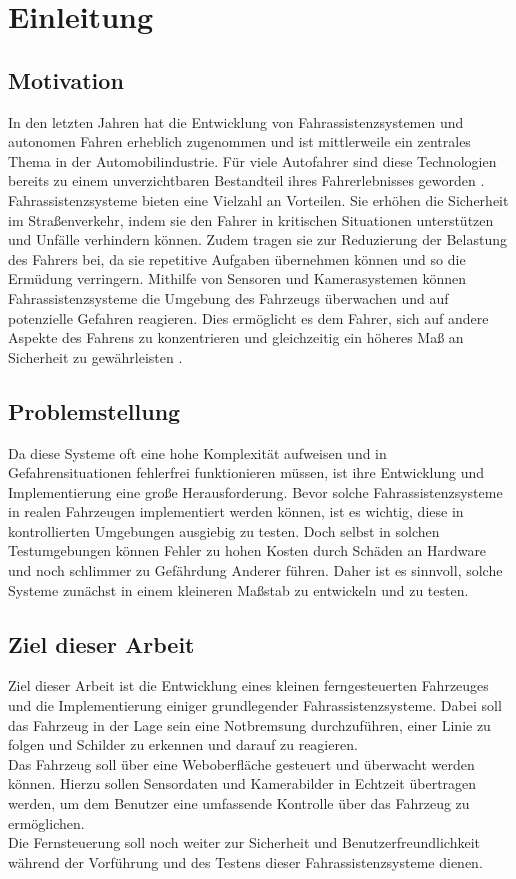 \chapter{Einleitung}
\label{chap:einleitung}
\section{Motivation}
In den letzten Jahren hat die Entwicklung von Fahrassistenzsystemen und autonomen Fahren erheblich zugenommen und ist mittlerweile ein zentrales Thema in der Automobilindustrie. Für viele Autofahrer sind diese Technologien bereits zu einem unverzichtbaren Bestandteil ihres Fahrerlebnisses geworden \cite{InfografikSelbstbestimmteAutofahrer}. 
Fahrassistenzsysteme bieten eine Vielzahl an Vorteilen. Sie erhöhen die Sicherheit im Straßenverkehr, indem sie den Fahrer in kritischen Situationen unterstützen und Unfälle verhindern können. Zudem tragen sie zur Reduzierung der Belastung des Fahrers bei, da sie repetitive Aufgaben übernehmen können und so die Ermüdung verringern.
Mithilfe von Sensoren und Kamerasystemen können Fahrassistenzsysteme die Umgebung des Fahrzeugs überwachen und auf potenzielle Gefahren reagieren. Dies ermöglicht es dem Fahrer, sich auf andere Aspekte des Fahrens zu konzentrieren und gleichzeitig ein höheres Maß an Sicherheit zu gewährleisten \cite[S. 65 ff.]{fahrassistenz}. 

\section{Problemstellung}
Da diese Systeme oft eine hohe Komplexität aufweisen und in Gefahrensituationen fehlerfrei funktionieren müssen, ist ihre Entwicklung und Implementierung eine große Herausforderung.
Bevor solche Fahrassistenzsysteme in realen Fahrzeugen implementiert werden können, ist es wichtig, diese in kontrollierten Umgebungen ausgiebig zu testen. Doch selbst in solchen Testumgebungen können Fehler zu hohen Kosten durch Schäden an Hardware und noch schlimmer zu Gefährdung Anderer führen.
Daher ist es sinnvoll, solche Systeme zunächst in einem kleineren Maßstab zu entwickeln und zu testen.

\section{Ziel dieser Arbeit}
Ziel dieser Arbeit ist die Entwicklung eines kleinen ferngesteuerten Fahrzeuges und die Implementierung einiger grundlegender Fahrassistenzsysteme. Dabei soll das Fahrzeug in der Lage sein eine Notbremsung durchzuführen, einer Linie zu folgen und Schilder zu erkennen und darauf zu reagieren. \\
Das Fahrzeug soll über eine Weboberfläche gesteuert und überwacht werden können. Hierzu sollen Sensordaten und Kamerabilder in Echtzeit übertragen werden, um dem Benutzer eine umfassende Kontrolle über das Fahrzeug zu ermöglichen. \\
Die Fernsteuerung soll noch weiter zur Sicherheit und Benutzerfreundlichkeit während der Vorführung und des Testens dieser Fahrassistenzsysteme dienen.

